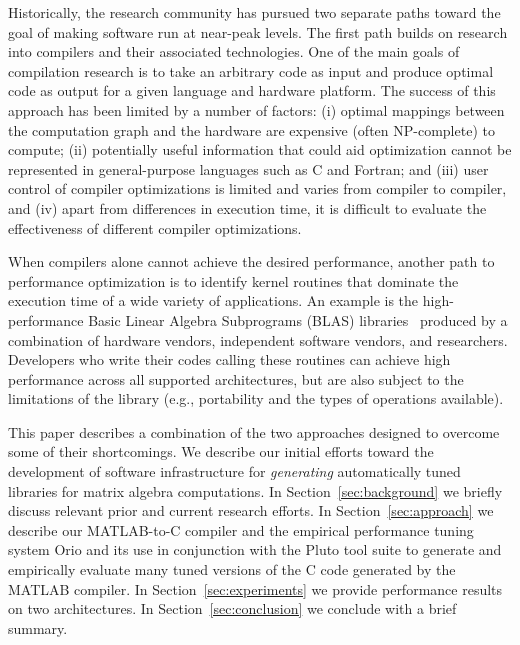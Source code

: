 \documentclass[runningheads]{llncs}
\begin{document}
Historically, the research community has pursued two separate paths toward
the goal of making software run at near-peak levels.  The first path builds
on research into compilers and their associated technologies.  One of the
main goals of compilation research is to take an arbitrary code as input and
produce optimal code as output for a given language and hardware platform.
The success of this approach has been limited by a number of factors: (i)
optimal mappings between the computation graph and the hardware are expensive
(often NP-complete) to compute; (ii) potentially useful information that
could aid optimization cannot be represented in general-purpose languages
such as C and Fortran; and (iii) user control of compiler optimizations is
limited and varies from compiler to compiler, and (iv) apart from differences
in execution time, it is difficult to evaluate the effectiveness of
different compiler optimizations.

When compilers alone cannot achieve the desired performance, 
another path to performance optimization is to identify kernel
routines that dominate the execution time of a wide variety of
applications.  
An example is the high-performance Basic Linear Algebra Subprograms 
(BLAS) libraries~\cite{BLAS} produced by a combination
of hardware vendors, independent software vendors, and researchers.
Developers who write their codes calling these routines can achieve high
performance across all supported architectures, but are also subject to 
the limitations of the library (e.g., portability and the types of operations available).

This paper describes a combination of the two approaches designed to overcome
some of their shortcomings. We describe our initial efforts toward the
development of software infrastructure for \emph{generating} automatically
tuned libraries for matrix algebra computations.  In
Section~\ref{sec:background} we briefly discuss relevant prior and current
research efforts. In Section~\ref{sec:approach} we describe our
MATLAB-to-C compiler and the empirical performance
tuning system Orio and its use in conjunction with the Pluto tool suite to
generate and empirically evaluate many tuned versions of the C code generated
by the MATLAB compiler.  In Section~\ref{sec:experiments} we provide
performance results on two architectures. In Section~\ref{sec:conclusion} we conclude 
with a brief summary.
\end{document}
